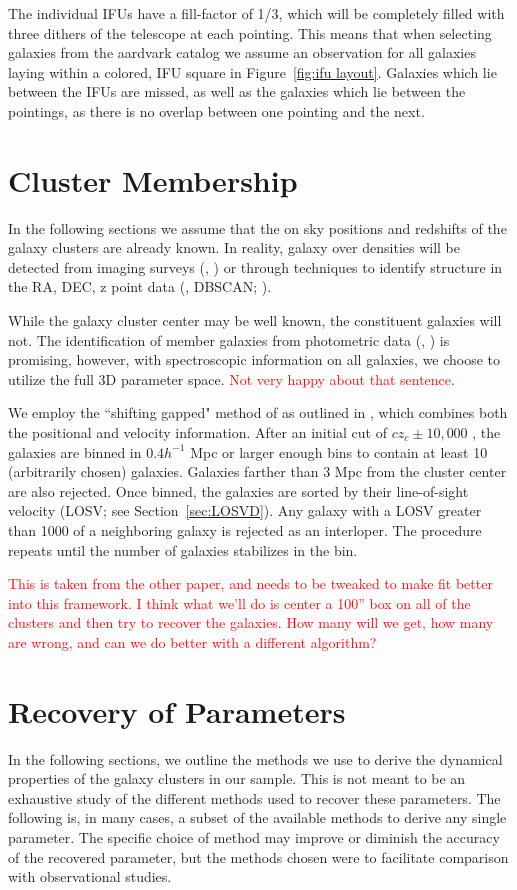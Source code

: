 \documentclass[apj, revtex4]{emulateapj}
\newcommand{\editorial}[1]{\textcolor{red}{#1}}
\newcommand{\citeeg}[1]{(\eg, \citealt{#1})}
\begin{document}
The individual IFUs have a fill-factor of 1/3, which will be completely filled with three dithers of the telescope at each pointing. This means that when selecting galaxies from the aardvark catalog we assume an observation for all galaxies laying within a colored, IFU square in Figure~\ref{fig:ifu layout}. Galaxies which lie between the IFUs are missed, as well as the galaxies which lie between the pointings, as there is no overlap between one pointing and the next.

\section{Cluster Membership}
In the following sections we assume that the on sky positions and redshifts of the galaxy clusters are already known. In reality, galaxy over densities will be detected from imaging surveys \citeeg{Rykoff2014} or through techniques to identify structure in the RA, DEC, z point data (\eg, DBSCAN; \citealt{Ester1996}).

While the galaxy cluster center may be well known, the constituent galaxies will not. The identification of member galaxies from photometric data \citeeg{Rozo2014} is promising, however, with spectroscopic information on all galaxies, we choose to utilize the full 3D parameter space. \editorial{Not very happy about that sentence}.

We employ the ``shifting gapped" method of \cite{Fadda1996} as outlined in \cite{Owers2011}, which combines both the positional and velocity information. After an initial cut of $cz_c \pm 10,000$ \kms, the galaxies are binned in $0.4h^{-1}$ Mpc or larger enough bins to contain at least 10 (arbitrarily chosen) galaxies. Galaxies farther than 3 Mpc from the cluster center are also rejected. Once binned, the galaxies are sorted by their line-of-sight velocity (LOSV; see Section~\ref{sec:LOSVD}). Any galaxy with a LOSV greater than 1000 \kms of a neighboring galaxy is rejected as an interloper. The procedure repeats until the number of galaxies stabilizes in the bin.

\editorial{This is taken from the other paper, and needs to be tweaked to make fit better into this framework. I think what we'll do is center a 100'' box on all of the clusters and then try to recover the galaxies. How many will we get, how many are wrong, and can we do better with a different algorithm?}

\section{Recovery of Parameters}
 In the following sections, we outline the methods we use to derive the dynamical properties of the galaxy clusters in our sample. This is not meant to be an exhaustive study of the different methods used to recover these parameters. The following is, in many cases, a subset of the available methods to derive any single parameter. The specific choice of method may improve or diminish the accuracy of the recovered parameter, but the methods chosen were to facilitate comparison with observational studies.  
\end{document}
